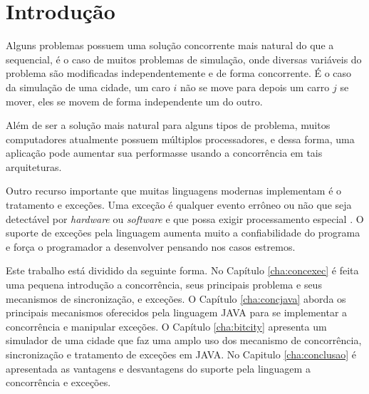 \chapter{Introdução}

Alguns problemas possuem uma solução concorrente mais natural do que a
sequencial, é o caso de muitos problemas de simulação, onde diversas
variáveis do problema são modificadas independentemente e de forma
concorrente. É o caso da simulação de uma cidade, um caro $i$ não se move
para depois um carro $j$ se mover, eles se movem de forma independente um
do outro.

Além de ser a solução mais natural para alguns tipos de problema, muitos
computadores atualmente possuem múltiplos processadores, e dessa forma, 
uma aplicação pode aumentar sua performasse usando a concorrência em tais
arquiteturas.

Outro recurso importante que muitas linguagens modernas implementam é o
tratamento e exceções. Uma exceção é qualquer evento errôneo ou não
que seja detectável por \textit{hardware} ou \textit{software} e que possa
exigir processamento especial \cite{sebesta}. O suporte de exceções pela
linguagem aumenta muito a confiabilidade do programa e força o programador
a desenvolver pensando nos casos estremos.

Este trabalho está dividido da seguinte forma. No Capítulo
\ref{cha:concexec} é feita uma pequena introdução a concorrência, seus
principais problema e seus mecanismos de sincronização, e exceções. O
Capítulo \ref{cha:concjava} aborda os principais mecanismos oferecidos pela
linguagem JAVA para se implementar a concorrência e manipular exceções. O
Capítulo \ref{cha:bitcity} apresenta um simulador de uma cidade que faz uma
amplo uso dos mecanismo de concorrência, sincronização e tratamento de
exceções em JAVA. No Capitulo \ref{cha:conclusao} é apresentada as
vantagens e desvantagens do suporte pela linguagem a concorrência e
exceções. 
